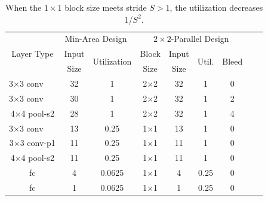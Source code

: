 \documentclass[journal]{IEEEtran}
\begin{document}
\begin{table}\scriptsize
	 \centering 
\caption{When the $1\times 1$ block size meets stride $S>1$, the utilization decreases 1/$S^2$. }\label{case1}
\begin{tabular}{|c|c|c|c|c|c|c|c
	c|}
\hline
\multirow{3}{*}{Layer Type }&  \multicolumn{2}{c|}{Min-Area Design~\cite{chung2015insight}}  &  \multicolumn{4}{c|}{$2\times2$-Parallel Design}  \\
\cline{2-7}
   & Input & \multirow{2}{*}{Utilization}  & Block  & Input &  \multirow{2}{*}{Util.} &\multirow{2}{*}{Bleed}    \\
   & Size  &       & Size   & Size &  &\\
   \hline

3$\times$3 conv~~~ & 32 & 1 & 2$\times$2 & 32 & 1 & 0 \\
3$\times$3 conv~~~ & 30 & 1 & 2$\times$2 & 32 & 1& 2\\
4$\times$4 pool-s2 & 28 & 1 & 2$\times$2 & 32 & 1 & 4\\
3$\times$3 conv~~~ & 13 & 0.25 & 1$\times$1 & 13 & 1 &0  \\
3$\times$3 conv-p1 & 11 & 0.25  & 1$\times$1 &  11 & 1 &0\\
4$\times$4 pool-s2 & 11 & 0.25  & 1$\times$1 & 11 & 1 &0\\
fc &  4 & 0.0625 & 1$\times$1 &  4 & 0.25 &0    \\
fc &  1 & 0.0625 & 1$\times$1 &  1 & 0.25 &0 \\

\hline
\end{tabular}\\\raggedright
\end{table}	
\end{document}
